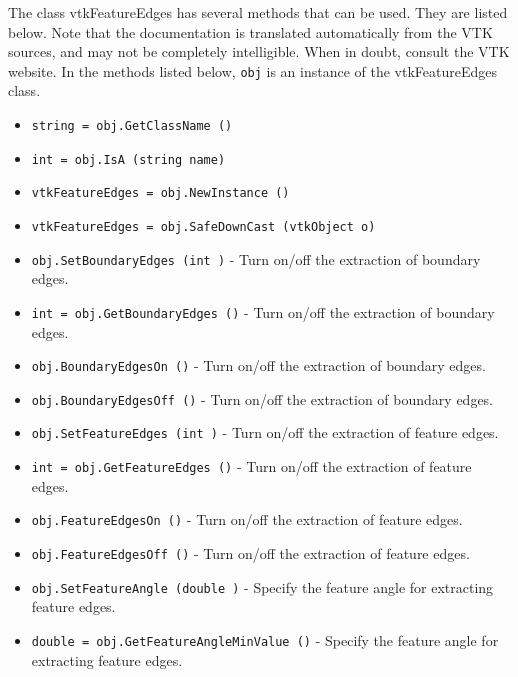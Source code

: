 The class vtkFeatureEdges has several methods that can be used.
  They are listed below.
Note that the documentation is translated automatically from the VTK sources,
and may not be completely intelligible.  When in doubt, consult the VTK website.
In the methods listed below, \verb|obj| is an instance of the vtkFeatureEdges class.
\begin{itemize}
\item  \verb|string = obj.GetClassName ()|

\item  \verb|int = obj.IsA (string name)|

\item  \verb|vtkFeatureEdges = obj.NewInstance ()|

\item  \verb|vtkFeatureEdges = obj.SafeDownCast (vtkObject o)|

\item  \verb|obj.SetBoundaryEdges (int )| -  Turn on/off the extraction of boundary edges.

\item  \verb|int = obj.GetBoundaryEdges ()| -  Turn on/off the extraction of boundary edges.

\item  \verb|obj.BoundaryEdgesOn ()| -  Turn on/off the extraction of boundary edges.

\item  \verb|obj.BoundaryEdgesOff ()| -  Turn on/off the extraction of boundary edges.

\item  \verb|obj.SetFeatureEdges (int )| -  Turn on/off the extraction of feature edges.

\item  \verb|int = obj.GetFeatureEdges ()| -  Turn on/off the extraction of feature edges.

\item  \verb|obj.FeatureEdgesOn ()| -  Turn on/off the extraction of feature edges.

\item  \verb|obj.FeatureEdgesOff ()| -  Turn on/off the extraction of feature edges.

\item  \verb|obj.SetFeatureAngle (double )| -  Specify the feature angle for extracting feature edges.

\item  \verb|double = obj.GetFeatureAngleMinValue ()| -  Specify the feature angle for extracting feature edges.


\end{itemize}
